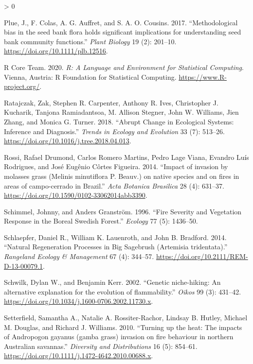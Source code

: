 \documentclass[
  12pt,
]{article}
\newlength{\cslhangindent}
\newenvironment{CSLReferences}[2] %
 {%
  \setlength{\parindent}{0pt}
  \ifodd #1 \everypar{\setlength{\hangindent}{\cslhangindent}}\ignorespaces\fi
  \ifnum #2 > 0
  \setlength{\parskip}{#2\baselineskip}
  \fi
 }%
 {}
\begin{document}
\begin{CSLReferences}{1}{0}
\leavevmode\hypertarget{ref-Plue2017}{}%
Plue, J., F. Colas, A. G. Auffret, and S. A. O. Cousins. 2017.
{``{Methodological bias in the seed bank flora holds significant
implications for understanding seed bank community functions}.''}
\emph{Plant Biology} 19 (2): 201--10.
\url{https://doi.org/10.1111/plb.12516}.

\leavevmode\hypertarget{ref-R}{}%
R Core Team. 2020. \emph{R: A Language and Environment for Statistical
Computing}. Vienna, Austria: R Foundation for Statistical Computing.
\url{https://www.R-project.org/}.

\leavevmode\hypertarget{ref-Ratajczak2018}{}%
Ratajczak, Zak, Stephen R. Carpenter, Anthony R. Ives, Christopher J.
Kucharik, Tanjona Ramiadantsoa, M. Allison Stegner, John W. Williams,
Jien Zhang, and Monica G. Turner. 2018. {``{Abrupt Change in Ecological
Systems: Inference and Diagnosis}.''} \emph{Trends in Ecology and
Evolution} 33 (7): 513--26.
\url{https://doi.org/10.1016/j.tree.2018.04.013}.

\leavevmode\hypertarget{ref-Rossi2014}{}%
Rossi, Rafael Drumond, Carlos Romero Martins, Pedro Lage Viana, Evandro
Luís Rodrigues, and José Eugênio Côrtes Figueira. 2014. {``{Impact of
invasion by molasses grass (Melinis minutiflora P. Beauv.) on native
species and on fires in areas of campo-cerrado in Brazil}.''} \emph{Acta
Botanica Brasilica} 28 (4): 631--37.
\url{https://doi.org/10.1590/0102-33062014abb3390}.

\leavevmode\hypertarget{ref-Schimmel1996}{}%
Schimmel, Johnny, and Anders Granström. 1996. {``{Fire Severity and
Vegetation Response in the Boreal Swedish Forest}.''} \emph{Ecology} 77
(5): 1436--50.

\leavevmode\hypertarget{ref-Schlaepfer2014}{}%
Schlaepfer, Daniel R., William K. Lauenroth, and John B. Bradford. 2014.
{``{Natural Regeneration Processes in Big Sagebrush (Artemisia
tridentata)}.''} \emph{Rangeland Ecology \& Management} 67 (4): 344--57.
\url{https://doi.org/10.2111/REM-D-13-00079.1}.

\leavevmode\hypertarget{ref-Schwilk2002}{}%
Schwilk, Dylan W., and Benjamin Kerr. 2002. {``{Genetic niche-hiking: An
alternative explanation for the evolution of flammability}.''}
\emph{Oikos} 99 (3): 431--42.
\url{https://doi.org/10.1034/j.1600-0706.2002.11730.x}.

\leavevmode\hypertarget{ref-Setterfield2010}{}%
Setterfield, Samantha A., Natalie A. Rossiter-Rachor, Lindsay B. Hutley,
Michael M. Douglas, and Richard J. Williams. 2010. {``{Turning up the
heat: The impacts of Andropogon gayanus (gamba grass) invasion on fire
behaviour in northern Australian savannas}.''} \emph{Diversity and
Distributions} 16 (5): 854--61.
\url{https://doi.org/10.1111/j.1472-4642.2010.00688.x}.


\end{CSLReferences}
\end{document}
